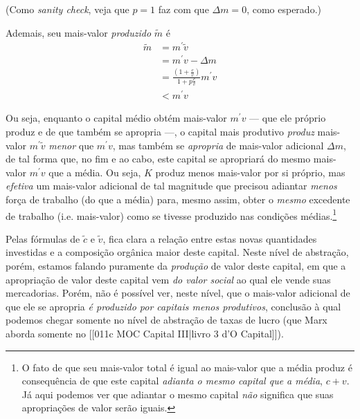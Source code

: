 (Como \textit{sanity check}, veja que $p=1$ faz com que $\Delta m=0$, como esperado.)

Ademais, seu mais-valor \textit{produzido} $\tilde{m}$ é 
\begin{align*}
\tilde{m} &= m^{\prime}\tilde{v}  \\
&= m^{\prime}v - \Delta m \\
&= \frac{\left( 1+\frac{c}{v} \right)}{1 + p \frac{c}{v}} m^{\prime} v  \\
&< m^{\prime}v
\end{align*}

Ou seja, enquanto o capital médio obtém mais-valor $m^{\prime}v$ — que ele próprio produz e de que também se apropria —, o capital mais produtivo \textit{produz} mais-valor $m^{\prime} \tilde{v}$ \textit{menor} que $m^{\prime}v$, mas também se \textit{apropria} de mais-valor adicional $\Delta m$, de tal forma que, no fim e ao cabo, este capital se apropriará do mesmo mais-valor $m^{\prime}v$ que a média. Ou seja, $K$ produz menos mais-valor por si próprio, mas \textit{efetiva} um mais-valor adicional de tal magnitude que precisou adiantar \textit{menos} força de trabalho (do que a média) para, mesmo assim, obter o \textit{mesmo} excedente de trabalho (i.e. mais-valor) como se tivesse produzido nas condições médias.\footnote{O fato de que seu mais-valor total é igual ao mais-valor que a média produz é consequência de que este capital \textit{adianta o mesmo capital que a média}, $c+v$. Já aqui podemos ver que adiantar o mesmo capital \textit{não} significa que suas apropriações de valor serão iguais.}

Pelas fórmulas de $\tilde{c}$ e $\tilde{v}$, fica clara a relação entre estas novas quantidades investidas e a composição orgânica maior deste capital. Neste nível de abstração, porém, estamos falando puramente da \textit{produção} de valor deste capital, em que a apropriação de valor deste capital vem \textit{do valor social} ao qual ele vende suas mercadorias. Porém, não é possível ver, neste nível, que o mais-valor adicional de que ele se apropria \textit{é produzido por capitais menos produtivos}, conclusão à qual podemos chegar somente no nível de abstração de taxas de lucro (que Marx aborda somente no [[011c MOC Capital III|livro 3 d'O Capital]]). 

